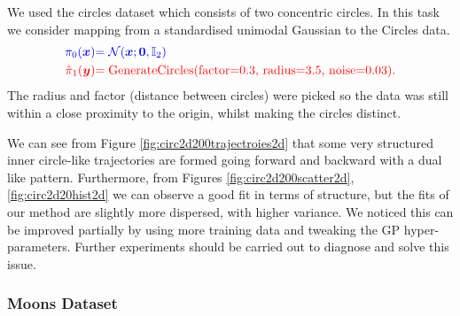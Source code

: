 \documentclass[a4paper,12pt,twoside,openright]{report}
\theoremstyle{definition}
\begin{document}
We  used the circles dataset \citep{pedregosa2011scikit} which consists of two concentric circles. In this task we consider mapping from a standardised unimodal Gaussian to the Circles data.
\begin{align*}
     \color{blue}{\pi_0({\bm{x}})} &\color{blue}{= {\mathcal{N}}({\bm{x}}; {\bm{0}},  \mathbb{I}_2)} \\
    \color{red}{\hat{\pi}_1({\bm{y}})} &\color{red}{= \text{GenerateCircles(factor=0.3, radius=3.5, noise=0.03)}}.
\end{align*}
The radius and factor (distance between circles) were picked so the data was still within a close proximity to the origin, whilst making the circles distinct.

We can see from Figure \ref{fig:circ2d200trajectroies2d} that some very structured inner circle-like trajectories are formed going forward and backward with a dual like pattern. Furthermore, from Figures \ref{fig:circ2d200scatter2d}, \ref{fig:circ2d20hist2d} we can observe a good fit in terms of structure, but the fits of our method are slightly more dispersed, with higher variance. We noticed this can be improved partially by using more training data and tweaking the GP hyper-parameters. Further experiments should be carried out to diagnose and solve this issue. 


\subsubsection{Moons Dataset}
\end{document}
